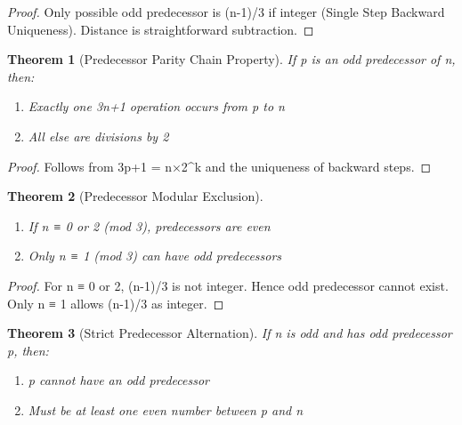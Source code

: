 \documentclass[11pt]{article}
\newtheorem{theorem}{Theorem}[section]
\begin{document}
\begin{proof}
Only possible odd predecessor is (n-1)/3 if integer (Single Step Backward Uniqueness). Distance is straightforward subtraction.
\end{proof}

\begin{theorem}[Predecessor Parity Chain Property]\label{thm:pred_chain}
If p is an odd predecessor of n, then:
\begin{enumerate}
    \item Exactly one 3n+1 operation occurs from p to n
    \item All else are divisions by 2
\end{enumerate}
\end{theorem}

\begin{proof}
Follows from 3p+1 = n×2^k and the uniqueness of backward steps.
\end{proof}

\begin{theorem}[Predecessor Modular Exclusion]\label{thm:pred_mod}
\begin{enumerate}
    \item If n ≡ 0 or 2 (mod 3), predecessors are even
    \item Only n ≡ 1 (mod 3) can have odd predecessors
\end{enumerate}
\end{theorem}

\begin{proof}
For n ≡ 0 or 2, (n-1)/3 is not integer. Hence odd predecessor cannot exist. Only n ≡ 1 allows (n-1)/3 as integer.
\end{proof}

\begin{theorem}[Strict Predecessor Alternation]\label{thm:strict_alt}
If n is odd and has odd predecessor p, then:
\begin{enumerate}
    \item p cannot have an odd predecessor
    \item Must be at least one even number between p and n
\end{enumerate}
\end{theorem}
\end{document}

